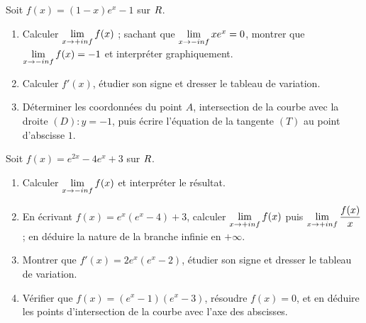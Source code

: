 \begin{annales}
Soit $f(x) = (1-x)e^{x}-1$ sur $R$.
\begin{enumerate}[label=\textbf{\alph*)}, leftmargin=*, itemsep=0.15em]
  \item Calculer $\limpinf f(x)$ ; sachant que $\limminf xe^{x} = 0$,
        montrer que $\limminf f(x) = -1$ et interpréter graphiquement.
  \item Calculer $f'(x)$, étudier son signe et dresser le tableau de
        variation.
  \item Déterminer les coordonnées du point $A$, intersection de la courbe
        avec la droite $(D) : y = -1$, puis écrire l'équation de la tangente
        $(T)$ au point d'abscisse $1$.
\end{enumerate}

Soit $f(x) = e^{2x}-4e^{x}+3$ sur $R$.
\begin{enumerate}[label=\textbf{\alph*)}, leftmargin=*, itemsep=0.15em]
  \item Calculer $\limminf f(x)$ et interpréter le résultat.
  \item En écrivant $f(x) = e^{x}\left(e^{x}-4\right)+3$, calculer
        $\limpinf f(x)$ puis $\limpinf \dfrac{f(x)}{x}$ ; en déduire la
        nature de la branche infinie en $+\infty$.
  \item Montrer que $f'(x) = 2e^{x}\left(e^{x}-2\right)$, étudier son signe
        et dresser le tableau de variation.
  \item Vérifier que $f(x) = \left(e^{x}-1\right)\left(e^{x}-3\right)$,
        résoudre $f(x) = 0$, et en déduire les points d'intersection de la
        courbe avec l'axe des abscisses.
\end{enumerate}
\end{annales}

